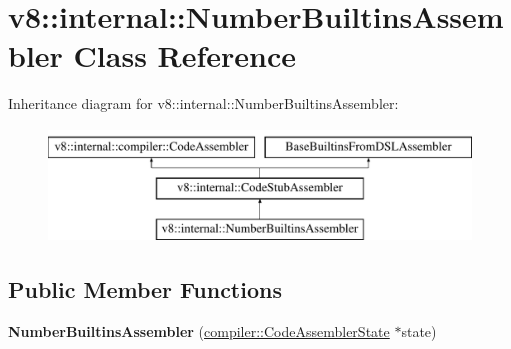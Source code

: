 \hypertarget{classv8_1_1internal_1_1NumberBuiltinsAssembler}{}\section{v8\+:\+:internal\+:\+:Number\+Builtins\+Assembler Class Reference}
\label{classv8_1_1internal_1_1NumberBuiltinsAssembler}
Inheritance diagram for v8\+:\+:internal\+:\+:Number\+Builtins\+Assembler\+:\begin{figure}[H]
\begin{center}
\leavevmode
\includegraphics[height=3.000000cm]{classv8_1_1internal_1_1NumberBuiltinsAssembler}
\end{center}
\end{figure}
\subsection*{Public Member Functions}
\begin{DoxyCompactItemize}
\item 
\mbox{\label{classv8_1_1internal_1_1NumberBuiltinsAssembler_ad1451c6d4cd62974b83f1856b8115931}} 
{\bfseries Number\+Builtins\+Assembler} (\mbox{\hyperlink{classv8_1_1internal_1_1compiler_1_1CodeAssemblerState}{compiler\+::\+Code\+Assembler\+State}} $\ast$state)
\end{DoxyCompactItemize}

